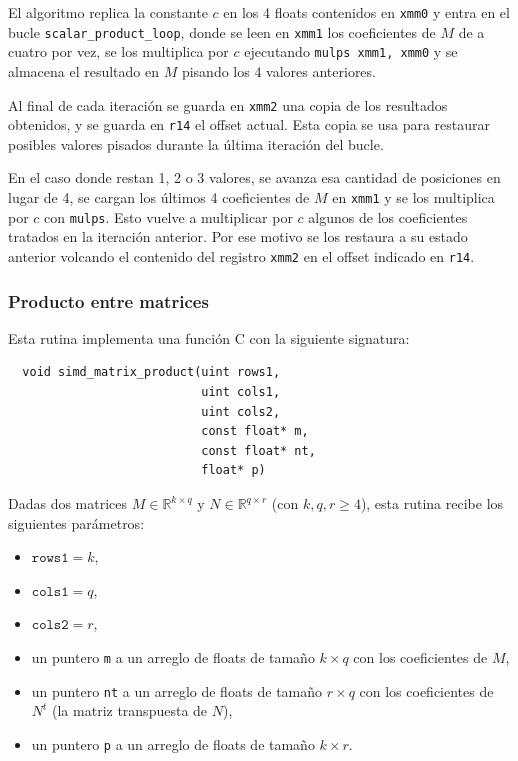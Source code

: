 \documentclass[a4paper, 10pt, twoside]{article}
\newcommand{\cc}[1]{\texttt{#1}}
\begin{document}
El algoritmo replica la constante $c$ en los 4 floats contenidos en \cc{xmm0} y
entra en el bucle \cc{scalar\_product\_loop}, donde se leen en \cc{xmm1} los
coeficientes de $M$ de a cuatro por vez, se los multiplica por $c$ ejecutando
\cc{mulps xmm1, xmm0} y se almacena el resultado en $M$ pisando los 4 valores
anteriores.

Al final de cada iteración se guarda en \cc{xmm2} una copia de los resultados
obtenidos, y se guarda en \cc{r14} el offset actual. Esta copia se usa para
restaurar posibles valores pisados durante la última iteración del bucle.

En el caso donde restan 1, 2 o 3 valores, se avanza esa cantidad de posiciones
en lugar de 4, se cargan los últimos 4 coeficientes de $M$ en \cc{xmm1} y se
los multiplica por $c$ con \cc{mulps}. Esto vuelve a multiplicar por $c$
algunos de los coeficientes tratados en la iteración anterior. Por ese motivo
se los restaura a su estado anterior volcando el contenido del registro
\cc{xmm2} en el offset indicado en \cc{r14}.


\subsubsection{Producto entre matrices}

Esta rutina implementa una función C con la siguiente signatura:

\begin{verbatim}
  void simd_matrix_product(uint rows1,
                           uint cols1,
                           uint cols2,
                           const float* m,
                           const float* nt,
                           float* p)
\end{verbatim}

Dadas dos matrices $M \in \mathbb{R}^{k \times q}$ y $N \in \mathbb{R}^{q \times
r}$ (con $k, q, r \geq 4$), esta rutina recibe los siguientes parámetros:

\begin{itemize}
  \item $\cc{rows1} = k$,
  \item $\cc{cols1} = q$,
  \item $\cc{cols2} = r$,
  \item un puntero \cc{m} a un arreglo de floats de tamaño $k \times q$ con los
    coeficientes de $M$,
  \item un puntero \cc{nt} a un arreglo de floats de tamaño $r \times q$ con
    los coeficientes de $N^t$ (la matriz transpuesta de $N$),
  \item un puntero \cc{p} a un arreglo de floats de tamaño $k \times r$.
\end{itemize}
\end{document}
